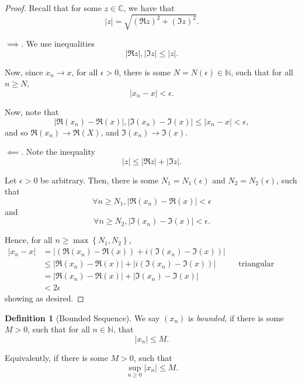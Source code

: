 \documentclass[11pt]{article}
\numberwithin{equation}{section}
\theoremstyle{definition}
\newtheorem{definition}[theorem]{Definition}
\theoremstyle{remark}
\newcommand{\pqty}[1]{\left(#1\right)}
\newcommand{\Bqty}[1]{\left\{#1\right\}}
\newcommand{\abs}[1]{\left|#1\right|}
\newcommand{\CC}{\mathbb C}
\newcommand{\NN}{\mathbb N}
\begin{document}
\begin{proof}
    Recall that for some \(z \in \CC\), we have that
    \[
        \abs{z} = \sqrt{\pqty{\Re z}^2 + \pqty{\Im z}^2}.
    \]
    
    \(\implies\). We use inequalities
    \[
        \abs{\Re z}, \abs{\Im z} \leq \abs{z}.
    \]

    Now, since \(x_n \to x\), for all \(\epsilon > 0\), there is some \(N = N\pqty{\epsilon} \in \NN\), such that for all \(n \geq N\),
    \[
        \abs{x_n - x} < \epsilon.
    \]

    Now, note that
    \[
        \abs{\Re\pqty{x_n} - \Re\pqty{x}}, \abs{\Im\pqty{x_n} - \Im\pqty{x}} \leq \abs{x_n - x} < \epsilon,
    \]
    and so \(\Re\pqty{x_n} \to \Re\pqty{X}\), and \(\Im\pqty{x_n} \to \Im\pqty{x}\).

    \(\impliedby\). Note the inequality
    \[
        \abs{z} \leq \abs{\Re z} + \abs{\Im z}.
    \]

    Let \(\epsilon > 0\) be arbitrary. Then, there is some \(N_1 = N_1 \pqty{\epsilon}\) and \(N_2 = N_2 \pqty{\epsilon}\), such that
    \[
        \forall n \geq N_1, \abs{\Re\pqty{x_n} - \Re\pqty{x}} < \epsilon
    \]
    and
    \[
        \forall n \geq N_2, \abs{\Im\pqty{x_n} - \Im\pqty{x}} < \epsilon.
    \]

    Hence, for all \(n \geq \max\Bqty{N_1, N_2}\),
    \begin{align*}
        \abs{x_n - x} &= \abs{\pqty{\Re \pqty{x_n} - \Re \pqty{x}} + i \pqty{\Im \pqty{x_n} - \Im \pqty{x}}} \\
        &\leq \abs{\Re\pqty{x_n} - \Re\pqty{x}} + \abs{i\pqty{\Im\pqty{x_n} - \Im\pqty{x}}} && \text{triangular inequality} \\
        &= \abs{\Re\pqty{x_n} - \Re\pqty{x}} + \abs{\Im\pqty{x_n} - \Im\pqty{x}} \\
        &< 2\epsilon
    \end{align*}
    showing as desired.
\end{proof}

\begin{definition}[Bounded Sequence]\label{analysis-unit-0011}
    \label{def:seq-bounded}%
    We say \(\pqty{x_n}\) is \emph{bounded}, if there is some \(M > 0\), such that for all \(n \in \NN\), that
    \[
        \abs{x_n} \leq M.
    \]

    Equivalently, if there is some \(M > 0\), such that
    \[
        \sup_{n \geq 0} \abs{x_n} \leq M.
    \]
\end{definition}
\end{document}
